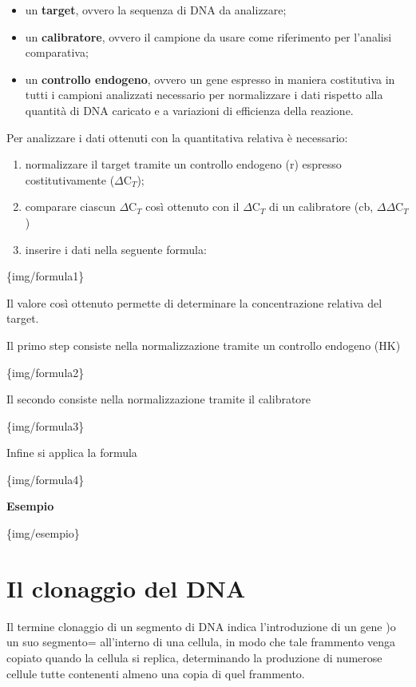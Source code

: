 \documentclass[11pt]{book}
\begin{document}
\begin{itemize}
\itemsep1pt\parskip0pt
\item
  un \textbf{target}, ovvero la sequenza di DNA da analizzare;
\item
  un \textbf{calibratore}, ovvero il campione da usare come riferimento
  per l'analisi comparativa;
\item
  un \textbf{controllo endogeno}, ovvero un gene espresso in maniera
  costitutiva in tutti i campioni analizzati necessario per normalizzare
  i dati rispetto alla quantità di DNA caricato e a variazioni di
  efficienza della reazione.
\end{itemize}

Per analizzare i dati ottenuti con la quantitativa relativa è
necessario:

\begin{enumerate}
\def\labelenumi{\arabic{enumi}.}
\itemsep1pt\parskip0pt
\item
  normalizzare il target tramite un controllo endogeno (r) espresso
  costitutivamente (\(\Delta\)C\(_T\));
\item
  comparare ciascun \(\Delta\)C\(_T\) così ottenuto con il
  \(\Delta\)C\(_T\) di un calibratore (cb, \(\Delta\)\(\Delta\)C\(_T\))
\item
  inserire i dati nella seguente formula:
\end{enumerate}

\{img/formula1\}

Il valore così ottenuto permette di determinare la concentrazione
relativa del target.

Il primo step consiste nella normalizzazione tramite un controllo
endogeno (HK)

\{img/formula2\}

Il secondo consiste nella normalizzazione tramite il calibratore

\{img/formula3\}

Infine si applica la formula

\{img/formula4\}

\textbf{Esempio}

\{img/esempio\}

\chapter{Il clonaggio del DNA}\label{il-clonaggio-del-dna}

Il termine clonaggio di un segmento di DNA indica l'introduzione di un
gene )o un suo segmento= all'interno di una cellula, in modo che tale
frammento venga copiato quando la cellula si replica, determinando la
produzione di numerose cellule tutte contenenti almeno una copia di quel
frammento.
\end{document}
